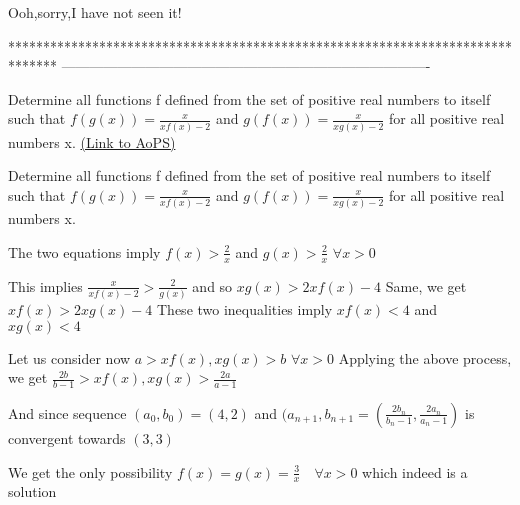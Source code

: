 


\begin{solution}
	Ooh,sorry,I have not seen it!
\end{solution}
*******************************************************************************
-------------------------------------------------------------------------------

\begin{problem}
	Determine all functions f defined from the set of positive real numbers to itself such that
$f( g(x)) = \frac{x}{xf(x) - 2}$ and  $g( f(x)) = \frac{x}{xg(x) - 2} $
for all positive real numbers x.
	\flushright \href{https://artofproblemsolving.com/community/c6h1601278}{(Link to AoPS)}
\end{problem}



\begin{solution}
	\begin{tcolorbox}Determine all functions f defined from the set of positive real numbers to itself such that
$f( g(x)) = \frac{x}{xf(x) - 2}$ and  $g( f(x)) = \frac{x}{xg(x) - 2} $
for all positive real numbers x.\end{tcolorbox}

The two equations imply $f(x)>\frac 2x$ and $g(x)>\frac 2x$ $\forall x>0$

This implies $\frac x{xf(x)-2}>\frac 2{g(x)}$ and so $xg(x)>2xf(x)-4$
Same, we get $xf(x)>2xg(x)-4$
These two inequalities imply $xf(x)<4$ and $xg(x)<4$

Let us consider now $a>xf(x),xg(x)>b$ $\forall x>0$
Applying the above process, we get $\frac {2b}{b-1}>xf(x),xg(x)>\frac {2a}{a-1}$

And since sequence $(a_0,b_0)=(4,2)$ and $(a_{n+1},b_{n+1}=(\frac {2b_n}{b_n-1},\frac{2a_n}{a_n-1})$ is convergent towards $(3,3)$

We get the only possibility $\boxed{f(x)=g(x)=\frac 3x\quad\forall x>0}$ which indeed is a solution

\end{solution}



